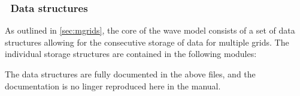 \vsssub
\subsubsection{~Data structures}
\vsssub

As outlined in \para\ref{sec:mgrids}, the core of the wave model consists of a
set of data structures allowing for the consecutive storage of data for
multiple grids. The individual storage structures are contained in the
following modules:

\begin{flist}
\end{flist}

\noindent
The data structures are fully documented in the above files, and the
documentation is no linger reproduced here in the manual.